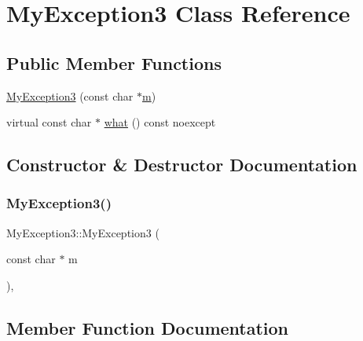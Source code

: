 \hypertarget{class_my_exception3}{}\section{My\+Exception3 Class Reference}
\label{class_my_exception3}
\subsection*{Public Member Functions}
\begin{DoxyCompactItemize}
\item 
\mbox{\hyperlink{class_my_exception3_a5927c6264e4814f9fe092b0c33e054a1}{My\+Exception3}} (const char $\ast$\mbox{\hyperlink{_s_d_l__opengl__glext_8h_af593500c283bf1a787a6f947f503a5c2}{m}})
\item 
virtual const char $\ast$ \mbox{\hyperlink{class_my_exception3_a7f94bec36360fef4942847e6859f6f05}{what}} () const noexcept
\end{DoxyCompactItemize}


\subsection{Constructor \& Destructor Documentation}
\mbox{\label{class_my_exception3_a5927c6264e4814f9fe092b0c33e054a1}} 
\subsubsection{\texorpdfstring{MyException3()}{MyException3()}}
{\footnotesize\ttfamily My\+Exception3\+::\+My\+Exception3 (\begin{DoxyParamCaption}\item[{const char $\ast$}]{m }\end{DoxyParamCaption})\hspace{0.3cm}{\ttfamily [inline]}, {\ttfamily [explicit]}}



\subsection{Member Function Documentation}
\mbox{\label{class_my_exception3_a7f94bec36360fef4942847e6859f6f05}} 

